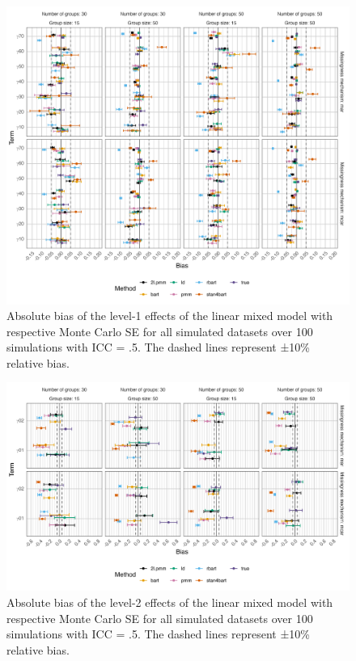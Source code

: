 \documentclass[preprint,12pt]{elsarticle}
\begin{document}
\begin{figure}[H]
    \centering 
    \includegraphics[width=1\textwidth]{biaslevel1.png}
    \caption{Absolute bias of the level-1 effects of the linear mixed model with respective Monte Carlo SE for all simulated datasets over 100 simulations with ICC = .5. The dashed lines represent ±10\% relative bias.}
    \label{fig:biaslevel1}
\end{figure}

\begin{figure}[H]
    \centering
    \includegraphics[width=1\textwidth]{biaslevel2.png}
    \caption{Absolute bias of the level-2 effects of the linear mixed model with respective Monte Carlo SE for all simulated datasets over 100 simulations with ICC = .5. The dashed lines represent ±10\% relative bias.}
    \label{fig:biaslevel2}
\end{figure}
\end{document}

